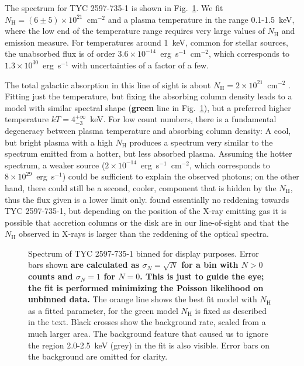 \documentclass[linenumbers]{aastex631}
\begin{document}
The spectrum for TYC 2597-735-1 is shown in Fig.~\ref{fig:TYC_spec}. We fit $N_\mathrm{H}=(6\pm5)\times10^{21}$~cm$^{-2}$ and a plasma temperature in the range 0.1-1.5~keV, where the low end of the temperature range requires very large values of $N_\mathrm{H}$ and emission measure. For temperatures around 1~keV, common for stellar sources, the unabsorbed flux is of order $3.6\times10^{-14}$~erg~s$^{-1}$~cm$^{-2}$, which corresponds to $1.3\times10^{30}$~erg~s$^{-1}$ with uncertainties of a factor of a few.

The total galactic absorption in this line of sight is about $N_\mathrm{H}=2\times10^{21}$~cm$^{-2}$ \citep{1990ARA&A..28..215D}. Fitting just the temperature, but fixing the absorbing column density leads to a model with similar spectral shape (\textbf{green} line in Fig.~\ref{fig:TYC_spec}), but a preferred higher temperature $kT=4_{-3}^{+\infty}$~keV.
For low count numbers, there is a fundamental degeneracy between plasma temperature and absorbing column density: A cool, but bright plasma with a high $N_\mathrm{H}$ produces a spectrum very similar to the spectrum emitted from a hotter, but less absorbed plasma.
Assuming the hotter spectrum, a weaker source ($2\times10^{-14}$~erg~s$^{-1}$~cm$^{-2}$, which corresponds to $8\times 10^{29}$~erg~s$^{-1}$) could be sufficient to explain the observed photons; on the other hand, there could still be a second, cooler, component that is hidden by the $N_\mathrm{H}$, thus the flux given is a lower limit only. \cite{2020Natur.587..387H} found essentially no reddening towards TYC 2597-735-1, but depending on the position of the X-ray emitting gas it is possible that accretion columns or the disk are in our line-of-sight and that the $N_\mathrm{H}$ observed in X-rays is larger than the reddening of the optical spectra.

\begin{figure}
    \caption{Spectrum of TYC 2597-735-1 binned for display purposes. Error bars shown \textbf{are calculated as $\sigma_N = \sqrt{N}$ for a bin with $N > 0$ counts and $\sigma_N=1$ for $N=0$. This is just to guide the eye; the fit is performed minimizing the Poisson likelihood on unbinned data.} The orange line shows the best fit model with $N_\mathrm{H}$ as a fitted parameter, for the green model $N_\mathrm{H}$ is fixed as described in the text. Black crosses show the background rate, scaled from a much larger area. The background feature that caused us to ignore the region 2.0-2.5~keV (grey) in the fit is also visible. Error bars on the background are omitted for clarity.
    \label{fig:TYC_spec}}
\end{figure}
\end{document}
